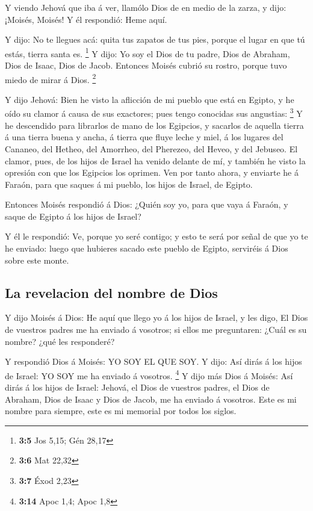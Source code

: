  Y viendo Jehová que iba á ver, llamólo Dios de en medio
de la zarza, y dijo: ¡Moisés, Moisés! Y él respondió: Heme aquí.

 Y dijo: No te llegues acá: quita tus zapatos de tus pies,
porque el lugar en que tú estás, tierra santa es. \footnote{\textbf{3:5}
  Jos 5,15; Gén 28,17}  Y dijo: Yo soy el Dios de tu
padre, Dios de Abraham, Dios de Isaac, Dios de Jacob. Entonces Moisés
cubrió su rostro, porque tuvo miedo de mirar á Dios. \footnote{\textbf{3:6}
  Mat 22,32}

 Y dijo Jehová: Bien he visto la aflicción de mi pueblo
que está en Egipto, y he oído su clamor á causa de sus exactores; pues
tengo conocidas sus angustias: \footnote{\textbf{3:7} Éxod 2,23}
 Y he descendido para librarlos de mano de los Egipcios, y
sacarlos de aquella tierra á una tierra buena y ancha, á tierra que
fluye leche y miel, á los lugares del Cananeo, del Hetheo, del Amorrheo,
del Pherezeo, del Heveo, y del Jebuseo.  El clamor, pues,
de los hijos de Israel ha venido delante de mí, y también he visto la
opresión con que los Egipcios los oprimen.  Ven por tanto
ahora, y enviarte he á Faraón, para que saques á mi pueblo, los hijos de
Israel, de Egipto.

 Entonces Moisés respondió á Dios: ¿Quién soy yo, para
que vaya á Faraón, y saque de Egipto á los hijos de Israel?

 Y él le respondió: Ve, porque yo seré contigo; y esto te
será por señal de que yo te he enviado: luego que hubieres sacado este
pueblo de Egipto, serviréis á Dios sobre este monte.

\hypertarget{la-revelacion-del-nombre-de-dios}{%
\subsection{La revelacion del nombre de
Dios}\label{la-revelacion-del-nombre-de-dios}}

 Y dijo Moisés á Dios: He aquí que llego yo á los hijos
de Israel, y les digo, El Dios de vuestros padres me ha enviado á
vosotros; si ellos me preguntaren: ¿Cuál es su nombre? ¿qué les
responderé?

 Y respondió Dios á Moisés: YO SOY EL QUE SOY. Y dijo:
Así dirás á los hijos de Israel: YO SOY me ha enviado á vosotros.
\footnote{\textbf{3:14} Apoc 1,4; Apoc 1,8}  Y dijo más
Dios á Moisés: Así dirás á los hijos de Israel: Jehová, el Dios de
vuestros padres, el Dios de Abraham, Dios de Isaac y Dios de Jacob, me
ha enviado á vosotros. Este es mi nombre para siempre, este es mi
memorial por todos los siglos.

